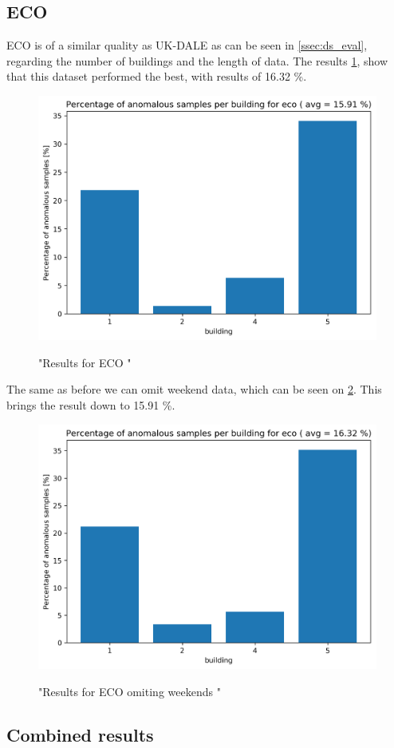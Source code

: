 \subsection{ECO}

ECO is of a similar quality as UK-DALE as can be seen in \ref{ssec:ds_eval}, regarding the number of buildings and the length of data.
The results \ref{fig:eco_res}, show that this dataset performed the best, with results of 16.32 \%.

\begin{figure}[H]
	\centering
	\caption{"Results for ECO "}
	\includegraphics[width=.7\textwidth]{Figures/EC/eco_res_nw_1.png}
	\label{fig:eco_res}
\end{figure}

The same as before we can omit weekend data, which can be seen on \ref{fig:eco_res_nw}. This brings the result down to 15.91 \%. 

\begin{figure}[H]
	\centering
	\caption{"Results for ECO omiting weekends "}
	\includegraphics[width=.7\textwidth]{Figures/EC/eco_res.png}
	\label{fig:eco_res_nw}
\end{figure}

\subsection{Combined results}

